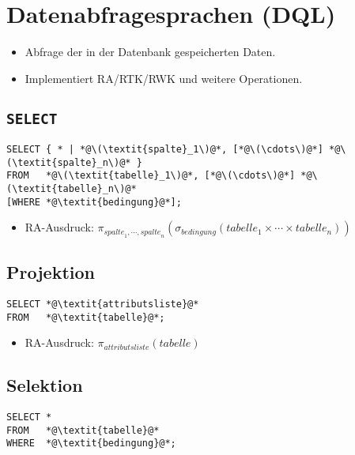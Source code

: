 	\section{Datenabfragesprachen (DQL)} %
		\begin{itemize}
			\item Abfrage der in der Datenbank gespeicherten Daten.
			\item Implementiert RA/RTK/RWK und weitere Operationen.
		\end{itemize}

		\subsection{\lstinline|SELECT|} %
			\begin{lstlisting}
SELECT { * | *@\(\textit{spalte}_1\)@*, [*@\(\cdots\)@*] *@\(\textit{spalte}_n\)@* }
FROM   *@\(\textit{tabelle}_1\)@*, [*@\(\cdots\)@*] *@\(\textit{tabelle}_n\)@*
[WHERE *@\textit{bedingung}@*];
            \end{lstlisting}

			\begin{itemize}
				\item RA-Ausdruck: \( \pi_{ \textit{spalte}_1, \cdots, \textit{spalte}_n } ( \sigma _ \textit{bedingung} ( \textit{tabelle}_1 \times \cdots \times \textit{tabelle}_n ) ) \)
			\end{itemize}

		\subsection{Projektion} %
			\begin{lstlisting}
SELECT *@\textit{attributsliste}@*
FROM   *@\textit{tabelle}@*;
            \end{lstlisting}

			\begin{itemize}
				\item RA-Ausdruck: \( \pi _ \textit{attributsliste} (\textit{tabelle}) \)
			\end{itemize}

		\subsection{Selektion} %
			\begin{lstlisting}
SELECT *
FROM   *@\textit{tabelle}@*
WHERE  *@\textit{bedingung}@*;
            \end{lstlisting}

